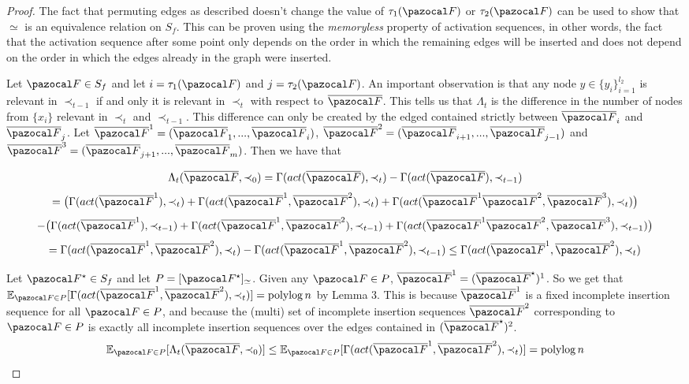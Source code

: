 \documentclass{report}
\DeclareMathOperator*{\polylog}{polylog}
\begin{document}
\begin{proof}
The fact that permuting edges as described doesn't change the value of $\tau_1(\pazocal F)$ or $\tau_2(\pazocal F)$ can be used to show that $\simeq$ is an equivalence relation on $S_f$. This can be proven using the \textit{memoryless} property of activation sequences, in other words, the fact that the activation sequence after some point only depends on the order in which the remaining edges will be inserted and does not depend on the order in which the edges already in the graph were inserted.

Let $\pazocal F \in S_f$ and let $i=\tau_1(\pazocal F)$ and $j=\tau_2(\pazocal F)$. An important observation is that any node $y \in \{y_i\}_{i=1}^{l_2}$ is relevant in $\prec_{t-1}$ if and only it is relevant in $\prec_t$ with respect to $\overline{\pazocal F}$. This tells us that $\Lambda_t$ is the difference in the number of nodes from $\{x_i\}$ relevant in $\prec_t$ and $\prec_{t-1}$. This difference can only be created by the edged contained strictly between $\overline{\pazocal F}_i$ and $\overline{\pazocal F}_j$. Let $\overline{\pazocal F}^1 = (\overline{\pazocal F}_1,...,\overline{\pazocal F}_i)$, $\overline{\pazocal F}^2 = (\overline{\pazocal F}_{i+1},...,\overline{\pazocal F}_{j-1})$ and $\overline{\pazocal F}^3 = (\overline{\pazocal F}_{j+1},...,\overline{\pazocal F}_m)$. Then we have that

\[ \Lambda_t(\overline{\pazocal F}, \prec_0) = \Gamma(act(\overline{\pazocal F}), \prec_{t}) - \Gamma(act(\overline{\pazocal F}), \prec_{t-1}) \]
\[ =\big(\Gamma(act(\overline{\pazocal F}^1), \prec_{t}) + \Gamma(act(\overline{\pazocal F}^1, \overline{\pazocal F}^2), \prec_{t}) + \Gamma(act(\overline{\pazocal F}^1\overline{\pazocal F}^2, \overline{\pazocal F}^3), \prec_{t}) \big) \]
\[ - \big(\Gamma(act(\overline{\pazocal F}^1), \prec_{t-1}) + \Gamma(act(\overline{\pazocal F}^1, \overline{\pazocal F}^2), \prec_{t-1}) + \Gamma(act(\overline{\pazocal F}^1\overline{\pazocal F}^2, \overline{\pazocal F}^3), \prec_{t-1}) \big)\]
\[ = \Gamma(act(\overline{\pazocal F}^1, \overline{\pazocal F}^2), \prec_{t}) - \Gamma(act(\overline{\pazocal F}^1, \overline{\pazocal F}^2), \prec_{t-1}) \leq \Gamma(act(\overline{\pazocal F}^1, \overline{\pazocal F}^2), \prec_{t}) \]

Let $\pazocal F^\star \in S_f$ and let $P=[\pazocal F^\star]_{\simeq}$. Given any $\pazocal F \in P$, $\overline{\pazocal F}^1 = (\overline{\pazocal F}^\star)^1$. So we get that $ \mathbb E_{\pazocal F \in P} [\Gamma(act(\overline{\pazocal F}^1, \overline{\pazocal F}^2), \prec_{t})] = \polylog n$ by Lemma 3. This is because $\overline{\pazocal F}^1$ is a fixed incomplete insertion sequence for all $\pazocal F \in P$, and because the (multi) set of incomplete insertion sequences $\overline{\pazocal F}^2$ corresponding to $\pazocal F \in P$ is exactly all incomplete insertion sequences over the edges contained in $(\overline{\pazocal F}^\star)^2$.
\[ \mathbb E_{\pazocal F \in P} [\Lambda_t(\overline{\pazocal F}, \prec_0)] \leq \mathbb E_{\pazocal F \in P} [\Gamma(act(\overline{\pazocal F}^1, \overline{\pazocal F}^2), \prec_{t})] = \polylog n \]
\end{proof}




\end{document}
